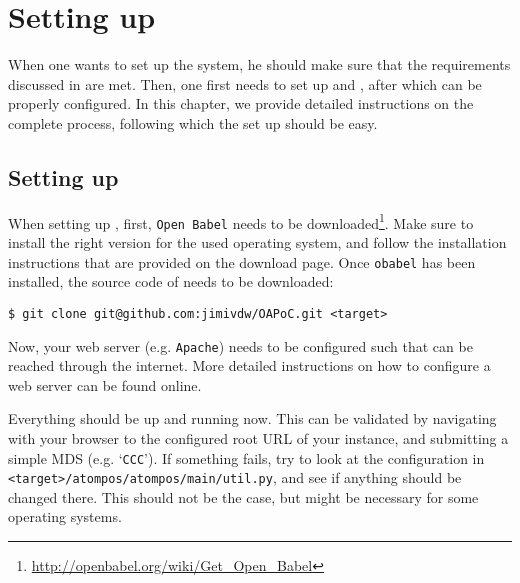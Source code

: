 \chapter{Setting up \oframp}

\lstset{language=sh, frame=single, basicstyle=\ttfamily\small, breaklines=true}

When one wants to set up the \oframp{} system, he should make sure that the requirements discussed in  are met. Then, one first needs to set up \oapoc{} and \omfraf{}, after which \oframp{} can be properly configured. In this chapter, we provide detailed instructions on the complete process, following which the set up should be easy.



\vspace{-.2cm}
\section[\oapoc]{Setting up \oapoc}
\vspace{-.1cm}
When setting up \oapoc, first, \verb|Open Babel| needs to be downloaded\footnote{\url{http://openbabel.org/wiki/Get_Open_Babel}}. Make sure to install the right version for the used operating system, and follow the installation instructions that are provided on the download page. Once \verb|obabel| has been installed, the source code of \oapoc{} needs to be downloaded:
\begin{lstlisting}
$ git clone git@github.com:jimivdw/OAPoC.git <target>
\end{lstlisting}
Now, your web server (e.g. \verb|Apache|) needs to be configured such that \oapoc{} can be reached through the internet. More detailed instructions on how to configure a web server can be found online.

Everything should be up and running now. This can be validated by navigating with your browser to the configured root URL of your \oapoc{} instance, and submitting a simple MDS (e.g. `\texttt{CCC}'). If something fails, try to look at the configuration in \verb|<target>/atompos/atompos/main/util.py|, and see if anything should be changed there. This should not be the case, but might be necessary for some operating systems.



\vspace{-.1cm}
